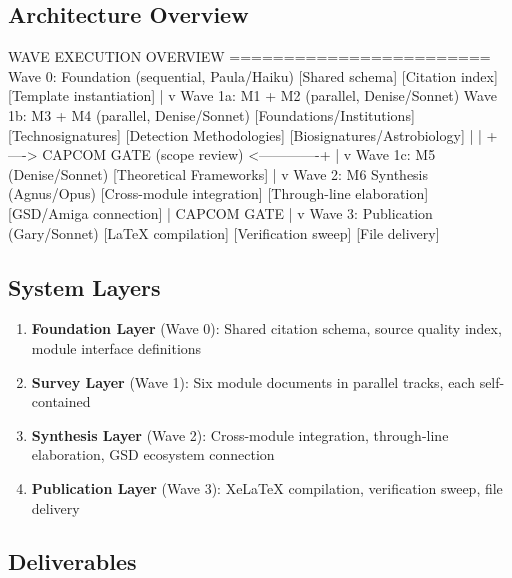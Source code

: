 \documentclass[11pt,letterpaper]{article}
\begin{document}
\subsection{Architecture Overview}

\begin{asciibox}
WAVE EXECUTION OVERVIEW
========================
Wave 0: Foundation (sequential, Paula/Haiku)
  [Shared schema] [Citation index] [Template instantiation]
        |
        v
Wave 1a: M1 + M2 (parallel, Denise/Sonnet)     Wave 1b: M3 + M4 (parallel, Denise/Sonnet)
  [Foundations/Institutions]                      [Technosignatures]
  [Detection Methodologies]                       [Biosignatures/Astrobiology]
           |                                                |
           +----> CAPCOM GATE (scope review) <-------------+
                        |
                        v
             Wave 1c: M5 (Denise/Sonnet)
               [Theoretical Frameworks]
                        |
                        v
             Wave 2: M6 Synthesis (Agnus/Opus)
               [Cross-module integration]
               [Through-line elaboration]
               [GSD/Amiga connection]
                        |
                   CAPCOM GATE
                        |
                        v
             Wave 3: Publication (Gary/Sonnet)
               [LaTeX compilation]
               [Verification sweep]
               [File delivery]
\end{asciibox}

\subsection{System Layers}

\begin{enumerate}[leftmargin=1.5em]
  \item \textbf{Foundation Layer} (Wave 0): Shared citation schema, source quality index, module interface definitions
  \item \textbf{Survey Layer} (Wave 1): Six module documents in parallel tracks, each self-contained
  \item \textbf{Synthesis Layer} (Wave 2): Cross-module integration, through-line elaboration, GSD ecosystem connection
  \item \textbf{Publication Layer} (Wave 3): XeLaTeX compilation, verification sweep, file delivery
\end{enumerate}

\subsection{Deliverables}
\end{document}
